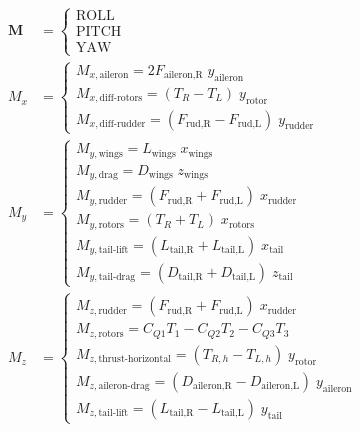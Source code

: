 \documentclass[12pt]{article}
\begin{document}
\[
  \begin{aligned}
    \mathbf{M} & = \left\{ \begin{array}{l}
                             \text{ROLL}  \\[4pt]
                             \text{PITCH} \\[4pt]
                             \text{YAW}
                           \end{array} \right. \\[16pt]
    M_x        & = \left\{ \begin{array}{l}
                             M_{x,\text{aileron}} = 2F_{\text{aileron,R}}\; y_{\text{aileron}}                    \\[6pt]
                             M_{x,\text{diff-rotors}} = (T_R - T_L)\; y_{\text{rotor}}                            \\[6pt]
                             M_{x,\text{diff-rudder}} = (F_{\text{rud,R}} - F_{\text{rud,L}})\; y_{\text{rudder}}
                           \end{array} \right. \\[20pt]
    M_y        & = \left\{ \begin{array}{l}
                             M_{y,\text{wings}} = L_{\text{wings}}\; x_{\text{wings}}                           \\[6pt]
                             M_{y,\text{drag}} = D_{\text{wings}}\; z_{\text{wings}}                            \\[6pt]
                             M_{y,\text{rudder}} = (F_{\text{rud,R}} + F_{\text{rud,L}})\; x_{\text{rudder}}    \\[6pt]
                             M_{y,\text{rotors}} = (T_R + T_L)\; x_{\text{rotors}}                              \\[6pt]
                             M_{y,\text{tail-lift}} = (L_{\text{tail,R}} + L_{\text{tail,L}})\; x_{\text{tail}} \\[6pt]
                             M_{y,\text{tail-drag}} = (D_{\text{tail,R}} + D_{\text{tail,L}})\; z_{\text{tail}}
                           \end{array} \right. \\[20pt]
    M_z        & = \left\{ \begin{array}{l}
                             M_{z,\text{rudder}} = (F_{\text{rud,R}} + F_{\text{rud,L}})\; x_{\text{rudder}}                \\[6pt]
                             M_{z,\text{rotors}} = C_{Q1}T_1 - C_{Q2}T_2 - C_{Q3}T_3                                        \\[6pt]
                             M_{z,\text{thrust-horizontal}} = (T_{R,h} - T_{L,h})\; y_{\text{rotor}}                        \\[6pt]
                             M_{z,\text{aileron-drag}} = (D_{\text{aileron,R}} - D_{\text{aileron,L}})\; y_{\text{aileron}} \\[6pt]
                             M_{z,\text{tail-lift}} = (L_{\text{tail,R}} - L_{\text{tail,L}})\; y_{\text{tail}}
                           \end{array} \right.
  \end{aligned}
\]
\end{document}

